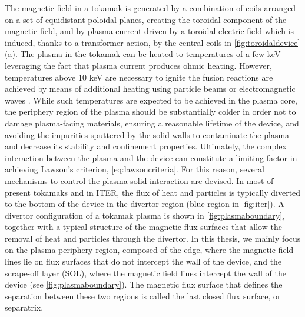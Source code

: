 The magnetic field in a tokamak is generated by a combination of coils arranged on a set of equidistant poloidal planes, creating the toroidal component of the magnetic field, and by plasma current driven by a toroidal electric field which is induced, thanks to a transformer action, by the central coils in \cref{fig:toroidaldevice} (a).
%
The plasma in the tokamak can be heated to temperatures of a few keV leveraging the fact that plasma current produces ohmic heating.
%
However, temperatures above 10 keV are necessary to ignite the fusion reactions are achieved by means of additional heating using particle beams or electromagnetic waves \citep{Wesson2004}.
%
While such temperatures are expected to be achieved in the plasma core, the periphery region of the plasma should be substantially colder in order not to damage plasma-facing materials, ensuring a reasonable lifetime of the device, and avoiding the impurities sputtered by the solid walls to contaminate the plasma and decrease its stability and confinement properties.
%
Ultimately, the complex interaction between the plasma and the device can constitute a limiting factor in achieving Lawson's criterion, \cref{eq:lawsoncriteria}.
%
For this reason, several mechanisms to control the plasma-solid interaction are devised.
%
In most of present tokamaks and in ITER, the flux of heat and particles is typically diverted to the bottom of the device in the divertor region (blue region in \cref{fig:iter}).
%
A divertor configuration of a tokamak plasma is shown in \cref{fig:plasmaboundary}, together with a typical structure of the magnetic flux surfaces that allow the removal of heat and particles through the divertor.
%
In this thesis, we mainly focus on the plasma periphery region, composed of the edge, where the magnetic field lines lie on flux surfaces that do not intercept the wall of the device, and the scrape-off layer (SOL), where the magnetic field lines intercept the wall of the device (see \cref{fig:plasmaboundary}).
%
The magnetic flux surface that defines the separation between these two regions is called the last closed flux surface, or separatrix.
%
